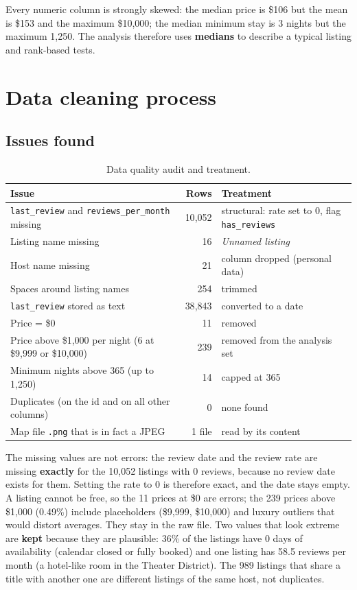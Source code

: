 \documentclass[12pt,a4paper]{article}
\begin{document}
Every numeric column is strongly skewed: the median price is \$106 but the mean is \$153 and the
maximum \$10{,}000; the median minimum stay is 3 nights but the maximum 1{,}250. The analysis therefore
uses \textbf{medians} to describe a typical listing and rank-based tests.

\section{Data cleaning process}\label{sec:clean}

\subsection{Issues found}

\begin{table}[H]\centering\small
\caption{Data quality audit and treatment.}
\begin{tabularx}{\linewidth}{@{}Xrl@{}}
\toprule
Issue & Rows & Treatment\\\midrule
\texttt{last\_review} and \texttt{reviews\_per\_month} missing & 10{,}052 & structural: rate set to 0, flag \texttt{has\_reviews}\\
Listing name missing & 16 & \emph{Unnamed listing}\\
Host name missing & 21 & column dropped (personal data)\\
Spaces around listing names & 254 & trimmed\\
\texttt{last\_review} stored as text & 38{,}843 & converted to a date\\
Price = \$0 & 11 & removed\\
Price above \$1{,}000 per night (6 at \$9{,}999 or \$10{,}000) & 239 & removed from the analysis set\\
Minimum nights above 365 (up to 1{,}250) & 14 & capped at 365\\
Duplicates (on the id and on all other columns) & 0 & none found\\
Map file \texttt{.png} that is in fact a JPEG & 1 file & read by its content\\
\bottomrule
\end{tabularx}
\end{table}

The missing values are not errors: the review date and the review rate are missing \textbf{exactly}
for the 10{,}052 listings with 0 reviews, because no review date exists for them. Setting the rate to
0 is therefore exact, and the date stays empty. A listing cannot be free, so the 11 prices at \$0
are errors; the 239 prices above \$1{,}000 (0.49\%) include placeholders (\$9{,}999, \$10{,}000) and
luxury outliers that would distort averages. They stay in the raw file. Two values that look extreme
are \textbf{kept} because they are plausible: 36\% of the listings have 0 days of availability
(calendar closed or fully booked) and one listing has 58.5 reviews per month (a hotel-like room in
the Theater District). The 989 listings that share a title with another one are different listings
of the same host, not duplicates.
\end{document}
